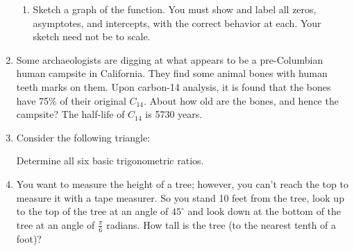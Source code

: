 \documentclass[letterpaper,12pt,fleqn]{article}
\begin{document}
\begin{enumerate}
\begin{enumerate}
\item Sketch a graph of the function. You must show and label all zeros,
asymptotes, and intercepts, with the correct behavior at each.  Your sketch
need not be to scale.
\end{enumerate}
\newpage
\item Some archaeologists are digging at what appears to be a pre-Columbian
human campsite in California.  They find some animal bones with human teeth
marks on them.  Upon carbon-14 analysis, it is found that the bones have 75\%
of their original $C_{14}$.  About how old are the bones, and hence the
campsite?  The half-life of $C_{14}$ is 5730 years.
\vspace{2in}
\item Consider the following triangle:


Determine all six basic trigonometric ratios.
\newpage
\item You want to measure the height of a tree; however, you can't reach the
top to measure it with a tape measurer. So you stand 10 feet from the tree,
look up to the top of the tree at an angle of $45^{\circ}$ and look down at the
bottom of the tree at an angle of $\frac{\pi}{6}$ radians.  How tall is the
tree (to the nearest tenth of a foot)?

\end{enumerate}
\end{document}
